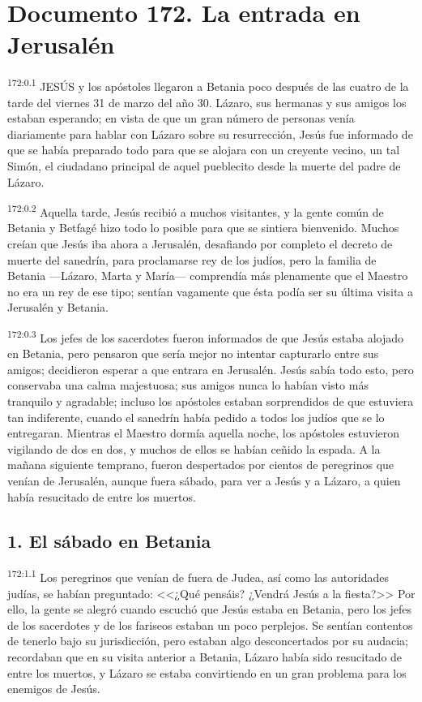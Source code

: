 \chapter{Documento 172. La entrada en Jerusalén}
\par 
\textsuperscript{172:0.1} JESÚS y los apóstoles llegaron a Betania poco después de las cuatro de la tarde del viernes 31 de marzo del año 30. Lázaro, sus hermanas y sus amigos los estaban esperando; en vista de que un gran número de personas venía diariamente para hablar con Lázaro sobre su resurrección, Jesús fue informado de que se había preparado todo para que se alojara con un creyente vecino, un tal Simón, el ciudadano principal de aquel pueblecito desde la muerte del padre de Lázaro.

\par 
\textsuperscript{172:0.2} Aquella tarde, Jesús recibió a muchos visitantes, y la gente común de Betania y Betfagé hizo todo lo posible para que se sintiera bienvenido. Muchos creían que Jesús iba ahora a Jerusalén, desafiando por completo el decreto de muerte del sanedrín, para proclamarse rey de los judíos, pero la familia de Betania ---Lázaro, Marta y María--- comprendía más plenamente que el Maestro no era un rey de ese tipo; sentían vagamente que ésta podía ser su última visita a Jerusalén y Betania.

\par 
\textsuperscript{172:0.3} Los jefes de los sacerdotes fueron informados de que Jesús estaba alojado en Betania, pero pensaron que sería mejor no intentar capturarlo entre sus amigos; decidieron esperar a que entrara en Jerusalén. Jesús sabía todo esto, pero conservaba una calma majestuosa; sus amigos nunca lo habían visto más tranquilo y agradable; incluso los apóstoles estaban sorprendidos de que estuviera tan indiferente, cuando el sanedrín había pedido a todos los judíos que se lo entregaran. Mientras el Maestro dormía aquella noche, los apóstoles estuvieron vigilando de dos en dos, y muchos de ellos se habían ceñido la espada. A la mañana siguiente temprano, fueron despertados por cientos de peregrinos que venían de Jerusalén, aunque fuera sábado, para ver a Jesús y a Lázaro, a quien había resucitado de entre los muertos.

\section*{1. El sábado en Betania}
\par 
\textsuperscript{172:1.1} Los peregrinos que venían de fuera de Judea, así como las autoridades judías, se habían preguntado: <<¿Qué pensáis? ¿Vendrá Jesús a la fiesta?>> Por ello, la gente se alegró cuando escuchó que Jesús estaba en Betania, pero los jefes de los sacerdotes y de los fariseos estaban un poco perplejos. Se sentían contentos de tenerlo bajo su jurisdicción, pero estaban algo desconcertados por su audacia; recordaban que en su visita anterior a Betania, Lázaro había sido resucitado de entre los muertos, y Lázaro se estaba convirtiendo en un gran problema para los enemigos de Jesús.

